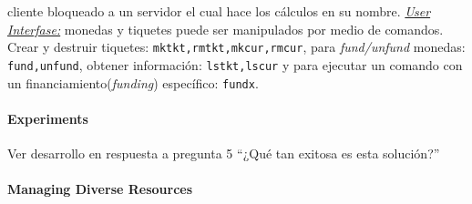 cliente bloqueado a un servidor el cual hace los cálculos en su nombre. \underline{\textit{User Interfase:}} monedas y tiquetes puede ser manipulados por medio de comandos. Crear y destruir tiquetes: \texttt{mktkt,rmtkt,mkcur,rmcur}, para \textit{fund/unfund} monedas: \texttt{fund,unfund}, obtener información: \texttt{lstkt,lscur} y para ejecutar un comando con un financiamiento(\textit{funding}) específico: \texttt{fundx}.

\paragraph{\textnormal{\textbf{Experiments}}} Ver desarrollo en respuesta a pregunta 5 ``¿Qué tan exitosa es esta solución?''

\paragraph{\textnormal{\textbf{Managing Diverse Resources}}}
